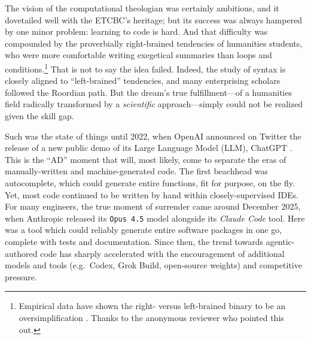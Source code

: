 \documentclass[11pt,a4paper]{article}
\begin{document}
The vision of the computational theologian was certainly ambitious, and it dovetailed well with
the ETCBC's heritage; but its success was always hampered by one minor problem: learning to code
is hard. And that difficulty was compounded by the proverbially right-brained tendencies of humanities students,
who were more comfortable writing exegetical summaries than loops and conditions.\footnote{
    Empirical data have shown the right- versus left-brained binary to be an oversimplification
    \cite{nielsen2013brain}. Thanks to the anonymous reviewer who pointed this out.
}
That is not to say the idea failed. Indeed, the study of syntax is closely aligned to ``left-brained'' tendencies,
and many enterprising scholars followed the Roordian path. But the dream's true fulfillment---of a humanities
field radically transformed by a \textit{scientific} approach---simply could not be realized given the
skill gap.

Such was the state of things until 2022, when OpenAI announced on Twitter the release of a new
public demo of its Large Language Model (LLM), ChatGPT \cite{openai2022chatgpt}. This is the ``AD'' moment that will,
most likely, come to separate the eras of manually-written and machine-generated code.
The first beachhead was autocomplete, which could generate entire functions, fit for purpose, on the fly.
Yet, most code continued to be written by hand within closely-supervised IDEs. For many engineers, the
true moment of surrender came around December 2025, when Anthropic released its \texttt{Opus 4.5} model alongside
its \textit{Claude Code} tool. Here was a tool which could reliably generate entire software packages in one go,
complete with tests and documentation. Since then, the trend towards agentic-authored code has sharply accelerated
with the encouragement of additional models and tools (e.g.~Codex, Grok Build, open-source weights) and competitive
pressure.
\end{document}
